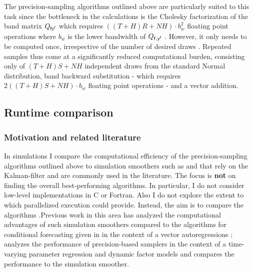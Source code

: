 \documentclass[notitlepage,a4paper,12pt]{article}
\begin{document}
The precision-sampling algorithms outlined above are particularly suited to this task since the bottleneck in the calculations is the Cholesky factorization of the band matrix $Q_{\sf{f} y^{\sf{f}}}$ which requires $((T+H)R+NH)\cdot b_w^2$ floating point operations where $b_w$ is the lower bandwidth of $Q_{\sf{f}, y^{\sf{f}}}$ \citep[][4.3.5]{GolubvanLoan2013}. However, it only needs to be computed once, irrespective of the number of desired draws \citep{rue2001_jrss}. Repeated samples thus come at a significantly reduced computational burden, consisting only of $(T+H)S+NH$ independent draws from the standard Normal distribution, band backward substitution - which requires $2 ((T+H)S+NH) \cdot b_w$ floating point operations \citep[][4.3.2]{GolubvanLoan2013}- and a vector addition. 

\subsection{Runtime comparison}

\subsubsection{Motivation and related literature}

In simulations I compare the computational efficiency of the precision-sampling algorithms outlined above to simulation smoothers such as \citet{carterkohn1994_biomtr} and \citet{durbinkoopman2002_biomtr} that rely on the Kalman-filter and are commonly used in the literature. The focus is \textbf{not} on finding the overall best-performing algorithms. In particular, I do not consider low-level implementations in C or Fortran. Also I do not explore the extent to which parallelized execution could provide. Instead, the aim is to compare the algorithms .Previous work in this area has analyzed the computational advantages of such simulation smoothers compared to the algorithms for conditional forecasting given in \citet{waggonerzha1999_res} in the context of a vector autoregressions \citep{bgl_2015ijf}; \citet{mmp2011_csda} analyzes the performance of precision-based samplers in the context of a time-varying parameter regression and dynamic factor models and compares the performance to the \citet{durbinkoopman2002_biomtr} simulation smoother.\\
\end{document}

